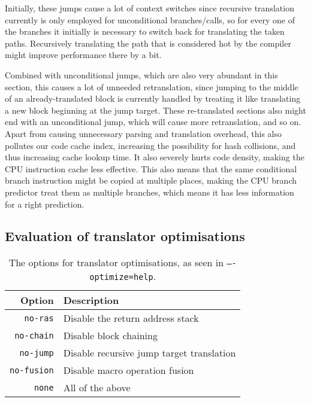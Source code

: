 Initially, these jumps cause a lot of context switches since recursive translation currently is only employed for unconditional branches/calls, so for every one of the branches it initially is necessary to switch back for translating the taken paths.
Recursively translating the path that is considered hot by the compiler might improve performance there by a bit.

Combined with unconditional jumps, which are also very abundant in this section, this causes a lot of unneeded retranslation, since jumping to the middle of an already-translated block is currently handled by treating it like translating a new block beginning at the jump target.
These re-translated sections also might end with an unconditional jump, which will cause more retranslation, and so on.
Apart from causing unnecessary parsing and translation overhead, this also pollutes our code cache index, increasing the possibility for hash collisions, and thus increasing cache lookup time.
It also severely hurts code density, making the CPU instruction cache less effective.
This also means that the same conditional branch instruction might be copied at multiple places, making the CPU branch predictor treat them as multiple branches, which means it has less information for a right prediction.


\subsection{Evaluation of translator optimisations}
\label{subsec:evaluation-of-translator-optimisations}
\begin{table}
	\centering
	\begin{tabular}{rl}
		\toprule
		\textbf{Option} & \textbf{Description}\\
		\midrule
		\texttt{no-ras} & Disable the return address stack\\
		\texttt{no-chain} & Disable block chaining\\
		\texttt{no-jump} & Disable recursive jump target translation\\
		\texttt{no-fusion} & Disable macro operation fusion\\
		\texttt{none} & All of the above\\
		\bottomrule
	\end{tabular}
	\caption[Translator optimisation options]%
	{The options for translator optimisations, as seen in \texttt{----optimize=help}.}
	\label{tab:opt-options}
\end{table}

